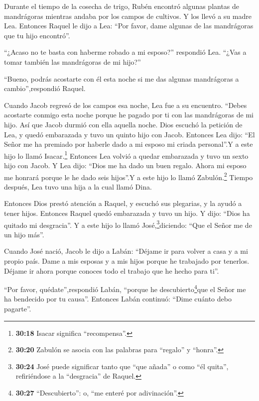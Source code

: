  Durante el tiempo de la cosecha de trigo, Rubén encontró
algunas plantas de mandrágoras mientras andaba por los campos de
cultivos. Y los llevó a su madre Lea. Entonces Raquel le dijo a Lea:
``Por favor, dame algunas de las mandrágoras que tu hijo encontró''.

 ``¿Acaso no te basta con haberme robado a mi esposo?''
respondió Lea. ``¿Vas a tomar también las mandrágoras de mi hijo?''

``Bueno, podrás acostarte con él esta noche si me das algunas
mandrágoras a cambio'',respondió Raquel.

 Cuando Jacob regresó de los campos esa noche, Lea fue a su
encuentro. ``Debes acostarte conmigo esta noche porque he pagado por ti
con las mandrágoras de mi hijo. Así que Jacob durmió con ella aquella
noche.  Dios escuchó la petición de Lea, y quedó embarazada
y tuvo un quinto hijo con Jacob.  Entonces Lea dijo: ``El
Señor me ha premiado por haberle dado a mi esposo mi criada personal''.Y
a este hijo lo llamó Isacar.\footnote{\textbf{30:18} Isacar significa
  ``recompensa''.}  Entonces Lea volvió a quedar embarazada
y tuvo un sexto hijo con Jacob.  Y Lea dijo: ``Dios me ha
dado un buen regalo. Ahora mi esposo me honrará porque le he dado seis
hijos''.Y a este hijo lo llamó Zabulón.\footnote{\textbf{30:20} Zabulón
  se asocia con las palabras para ``regalo'' y ``honra''.} 
Tiempo después, Lea tuvo una hija a la cual llamó Dina.

 Entonces Dios prestó atención a Raquel, y escuchó sus
plegarias, y la ayudó a tener hijos.  Entonces Raquel quedó
embarazada y tuvo un hijo. Y dijo: ``Dios ha quitado mi desgracia''.
 Y a este hijo lo llamó José,\footnote{\textbf{30:24} José
  puede significar tanto que ``que añada'' o como ``él quita'',
  refiriéndose a la ``desgracia'' de Raquel.}diciendo: ``Que el Señor me
de un hijo más''.

 Cuando José nació, Jacob le dijo a Labán: ``Déjame ir para
volver a casa y a mi propio país.  Dame a mis esposas y a
mis hijos porque he trabajado por tenerlos. Déjame ir ahora porque
conoces todo el trabajo que he hecho para ti''.

 ``Por favor, quédate'',respondió Labán, ``porque he
descubierto\footnote{\textbf{30:27} ``Descubierto'': o, ``me enteré por
  adivinación''.}que el Señor me ha bendecido por tu causa''.
 Entonces Labán continuó: ``Dime cuánto debo pagarte''.


